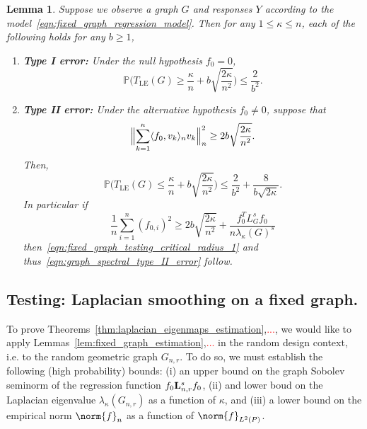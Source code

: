 \documentclass{article}
\newcommand{\1}{\mathbf{1}}
\newcommand{\Lap}{{\bf L}}
\newcommand{\Pbb}{\mathbb{P}}
\newcommand{\dotp}[2]{\langle #1, #2 \rangle}
\newcommand{\LE}{\mathrm{LE}}
\theoremstyle{alden}
\theoremstyle{aldenthm}
\newtheorem{lemma}{Lemma}
\theoremstyle{definition}
\theoremstyle{remark}
\begin{document}
\begin{lemma}
	\label{lem:fixed_graph_testing}
	Suppose we observe a graph $G$ and responses $Y$ according to the model~\eqref{eqn:fixed_graph_regression_model}. Then for any $1 \leq \kappa \leq n$, each of the following holds for any $b \geq 1$,
	\begin{enumerate}
		\item \textbf{Type I error:} Under the null hypothesis $f_0 = 0$,
		\begin{equation}
		\label{eqn:graph_spectral_type_I_error}
		\Pbb\biggl(T_{\LE}(G) \geq \frac{\kappa}{n} + b\sqrt{\frac{2\kappa}{n^2}}\biggr) \leq \frac{2}{b^2}.
		\end{equation}
		\item \textbf{Type II error:} Under the alternative hypothesis $f_0 \neq 0$, suppose that
		\begin{equation}
		\label{eqn:fixed_graph_testing_critical_radius_1}
		\Bigl\|\sum_{k = 1}^{\kappa} \dotp{f_0}{v_k}_n v_k\Bigr\|_n^2 \geq 2b\sqrt{\frac{2\kappa}{n^2}}.
		\end{equation}
		Then,
		\begin{equation}
		\label{eqn:graph_spectral_type_II_error}
		\Pbb\biggl(T_{\LE}(G) \leq \frac{\kappa}{n} + b\sqrt{\frac{2\kappa}{n^2}}\biggr) \leq \frac{2}{b^2} + \frac{8}{b\sqrt{2\kappa}}.
		\end{equation}
		In particular if
		\begin{equation}
		\label{eqn:fixed_graph_testing_critical_radius}
		\frac{1}{n} \sum_{i = 1}^{n} (f_{0,i})^2 \geq 2b\sqrt{\frac{2\kappa}{n^2}} + \frac{f_0^T L_G^s f_0}{n\lambda_{\kappa}(G)^s}
		\end{equation}
		then~\eqref{eqn:fixed_graph_testing_critical_radius_1} and thus~\eqref{eqn:graph_spectral_type_II_error} follow.
	\end{enumerate}
\end{lemma}

\subsection{Testing: Laplacian smoothing on a fixed graph.}

\clearpage
To prove Theorems~\ref{thm:laplacian_eigenmaps_estimation},\textcolor{red}{...}, we would like to apply Lemmas~\ref{lem:fixed_graph_estimation},\textcolor{red}{...} in the random design context, i.e. to the random geometric graph $G_{n,r}$. To do so, we must establish the following (high probability) bounds: (i) an upper bound on the graph Sobolev seminorm of the regression function $f_0 \Lap_{n,r}^s f_0$, (ii) and lower boud on the Laplacian eigenvalue $\lambda_{\kappa}(G_{n,r})$ as a function of $\kappa$, and (iii) a lower bound on the empirical norm $\norm{f}_{n}$ as a function of $\norm{f}_{L^2(P)}$. 
\end{document}
